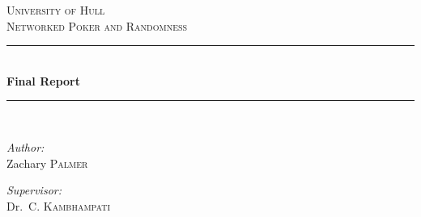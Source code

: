 \begin{titlepage}

\newcommand{\HRule}{\rule{\linewidth}{0.5mm}} %

\center{} %
 

\textsc{\LARGE University of Hull}\\[1.5cm] %
\textsc{\Large Networked Poker and Randomness}\\[0.5cm] %


\HRule\\[0.4cm]
{\huge \bfseries Final Report}\\[0.4cm] %
\HRule\\[1.5cm]
 

\begin{minipage}{0.4\textwidth}
\begin{flushleft} \large
\emph{Author:}\\
Zachary \textsc{Palmer} %
\end{flushleft}
\end{minipage}
\begin{minipage}{0.4\textwidth}
\begin{flushright} \large
\emph{Supervisor:} \\
Dr.\ C. \textsc{Kambhampati} %
\end{flushright}
\end{minipage}\\[2cm]


\end{titlepage}
